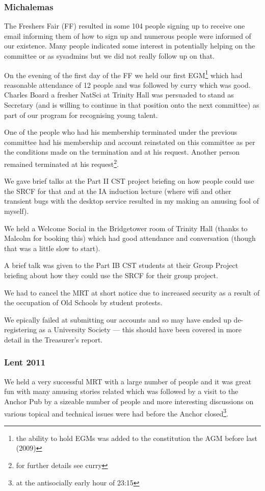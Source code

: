 \subsubsection{Michalemas}
The Freshers Fair (FF) resulted in some 104 people signing up to receive one email informing them of how to sign up and numerous people were informed of our existence. Many people indicated some interest in potentially helping on the committee or as sysadmins but we did not really follow up on that.

On the evening of the first day of the FF we held our first EGM\footnote{the ability to hold EGMs was added to the constitution the AGM before last (2009)} which had reasonable attendance of 12 people and was followed by curry which was good. Charles Board a fresher NatSci at Trinity Hall was persuaded to stand as Secretary (and is willing to continue in that position onto the next committee) as part of our program for recognising young talent.

One of the people who had his membership terminated under the previous committee had his membership and account reinstated on this committee as per the conditions made on the termination and at his request. Another person remained terminated at his request\footnote{for further details see curry}.

We gave brief talks at the Part II CST project briefing on how people could use the SRCF for that and at the IA induction lecture (where wifi and other transient bugs with the desktop service resulted in my making an amusing fool of myself).

We held a Welcome Social in the Bridgetower room of Trinity Hall (thanks to Malcolm for booking this) which had good attendance and conversation (though that was a little slow to start).

A brief talk was given to the Part IB CST students at their Group Project briefing about how they could use the SRCF for their group project.

We had to cancel the MRT at short notice due to increased security as a result of the occupation of Old Schools by student protests.

We epically failed at submitting our accounts and so may have ended up de-registering as a University Society --- this should have been covered in more detail in the Treasurer's report.

\subsubsection{Lent 2011}
We held a very successful MRT with a large number of people and it was great fun with many amusing stories related which was followed by a visit to the Anchor Pub by a sizeable number of people and more interesting discussions on various topical and technical issues were had before the Anchor closed\footnote{at the antisocially early hour of 23:15}.


